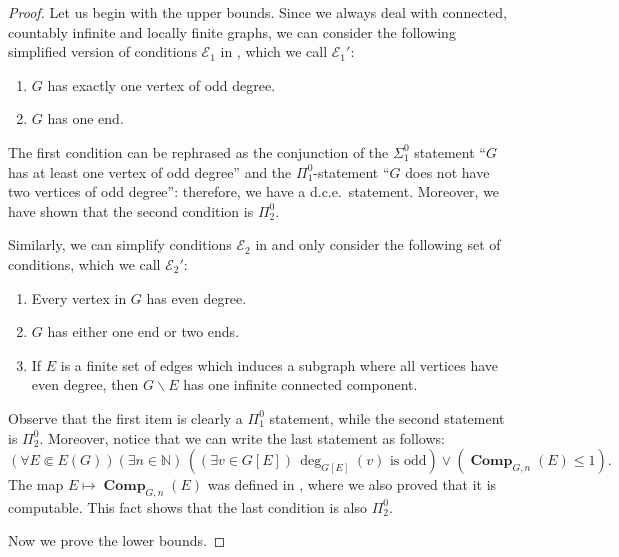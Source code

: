 \documentclass[10pt,A4]{amsart}
\theoremstyle{definition}
\theoremstyle{definition}
\newcommand{\eulerone}{\mathscr{E} _{1}}
\newcommand{\eulertwo}{\mathscr{E} _{2}}
\newcommand{\N}{\mathbb{N}}
\newcommand{\vir}[1]{``#1''}
\newcommand{\comp}{\operatorname{\mathbf{Comp}}}
\begin{document}
\begin{proof}
    Let us begin with the upper bounds.
    Since we always deal with connected, countably infinite and locally finite graphs, we can consider the following simplified version of conditions $\eulerone$ in , which we call $\eulerone '$:
\begin{enumerate}
    \item $G$ has exactly one vertex of odd degree.
    \item $G$ has one end.
\end{enumerate}
The first condition can be rephrased as the conjunction of the $\Sigma_1^0$ statement \vir {$G$ has at least one vertex of odd degree} and the $\Pi_1^0$-statement \vir{$G$ does not have two vertices of odd degree}: therefore, we have a d.c.e.~statement. %
Moreover, we have shown that the second condition is $\Pi_2^0$.

Similarly, we can simplify conditions $\eulertwo$ in  and only consider the following set of conditions, which we call $\eulertwo '$:
\begin{enumerate}
    \item Every vertex in $G$ has even degree.
    \item $G$ has either one end or two ends.
    \item If $E$ is a finite set of edges
        which induces a subgraph where all vertices have even degree, then
        $G\smallsetminus E$ has one infinite connected component.
\end{enumerate}
Observe that the first item is clearly a $\Pi_1^0$ statement, while the second statement is $\Pi_2^0$. Moreover, notice that we can write the last statement as follows: $$(\forall E \Subset E(G))(\exists n\in\N) \, ((\exists v \in G[E]) \, \deg_{G[E]}(v)\text{ is odd}) \lor (\comp_{G,n}(E)\leq 1).$$  The map $E\mapsto \comp_{G,n}(E)$ was defined in  , where we also proved that it is computable. This fact shows that the last condition is also $\Pi_2^0$. %

Now we prove the lower bounds. 


\end{proof}
\end{document}
